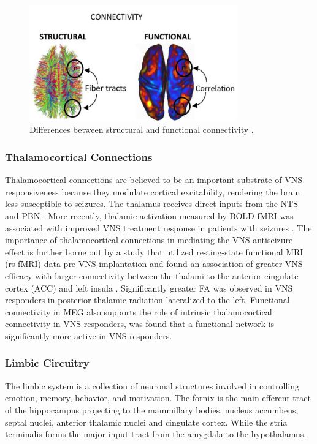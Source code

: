     \begin{figure}[h]
      \centering
      \includegraphics[width=0.8\textwidth]{images/structuralFunctional.png}
      \caption{Differences between structural and functional connectivity \cite{CABRAL201784}.}
      \label{fig:Structural and Functional Connections}
    \end{figure}

    \subsubsection*{Thalamocortical Connections}
    Thalamocortical connections are believed to be an important substrate of VNS responsiveness because they modulate cortical excitability, rendering the brain less susceptible to seizures. The thalamus receives direct inputs from the NTS and PBN \cite{BecksteadJoel2980}. More recently, thalamic activation measured by BOLD fMRI was associated with improved VNS treatment response in patients with seizures \cite{NarayananWatts2002}. The importance of thalamocortical connections in mediating the VNS antiseizure effect is further borne out by a study that utilized resting-state functional MRI (rs-fMRI) data pre-VNS implantation and found an association of greater VNS efficacy with larger connectivity between the thalami to the anterior cingulate cortex (ACC) and left insula \cite{IBRAHIM2017634}.
    Significantly greater FA was observed in VNS responders in posterior thalamic radiation lateralized to the left. %
    Functional connectivity in MEG also supports the role of intrinsic thalamocortical connectivity in VNS responders, was found that a functional network is significantly more active in VNS responders. \cite{Mithani2019}


    \subsubsection*{Limbic Circuitry}
    The limbic system is a collection of neuronal structures involved in controlling emotion, memory, behavior, and motivation. The fornix is the main efferent tract of the hippocampus projecting to the mammillary bodies, nucleus accumbens, septal nuclei, anterior thalamic nuclei and cingulate cortex. While the stria terminalis forms the major input tract from the amygdala to the hypothalamus. 


